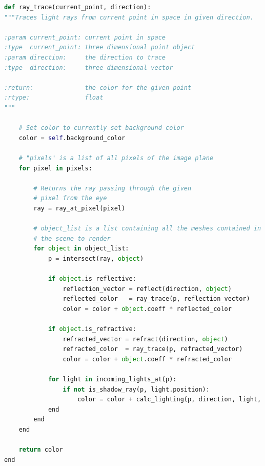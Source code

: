 \begin{lstlisting}[language=Python,caption={Eine abstrakte Umsetzung des
        Ray Tracings \protect\footnotemark.},
    label={fig:ray_tracing:high_level},captionpos=b,emph={ray_trace}]
def ray_trace(current_point, direction):
"""Traces light rays from current point in space in given direction.

:param current_point: current point in space
:type  current_point: three dimensional point object
:param direction:     the direction to trace
:type  direction:     three dimensional vector

:return:              the color for the given point
:rtype:               float
"""

    # Set color to currently set background color
    color = self.background_color

    # "pixels" is a list of all pixels of the image plane
    for pixel in pixels:

        # Returns the ray passing through the given
        # pixel from the eye
        ray = ray_at_pixel(pixel)

        # object_list is a list containing all the meshes contained in
        # the scene to render
        for object in object_list:
            p = intersect(ray, object)

            if object.is_reflective:
                reflection_vector = reflect(direction, object)
                reflected_color   = ray_trace(p, reflection_vector)
                color = color + object.coeff * reflected_color

            if object.is_refractive:
                refracted_vector = refract(direction, object)
                refracted_color  = ray_trace(p, refracted_vector)
                color = color + object.coeff * refracted_color

            for light in incoming_lights_at(p):
                if not is_shadow_ray(p, light.position):
                    color = color + calc_lighting(p, direction, light, object)
            end
        end
    end

    return color
end
\end{lstlisting}
